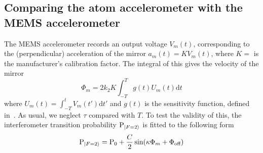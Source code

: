 \subsection{Comparing the atom accelerometer with the MEMS
accelerometer}\label{subsec:vibration_sensitivity}
The MEMS accelerometer records an output voltage $V_m (t)$,
corresponding to the (perpendicular) acceleration of the mirror $a_m
(t) = K V_m(t)$, where $K =$  is
the manufacturer's calibration factor. The integral of this gives the
velocity of the mirror
\begin{equation}
  \Phi_m =  2k_2 K\int_{-T}^{T} g(t) U_m(t)
  \mathrm{d}t
  \label{eq:phase_vib}
\end{equation}
where \(U_m(t) = \int_{-T}^{t} V_m(t') \mathrm{d}t'\) 
and \(g(t)\) is 
the sensitivity function, defined
in~. As usual, we neglect
$\tau$ compared with $T$. 
To test the validity of this, the interferometer transition
probability $\text{P}_{\ket{F=2}}$ is fitted to the following form
\begin{equation}
  \text{P}_{\ket{F=2}} = \text{P}_0 + \frac{C}{2}\sin(\kappa
  \Phi_m + \Phi_\text{off})
  \label{eq:fringe_fit_vibration}
\end{equation}
